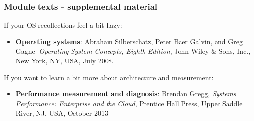 \begin{frame}
  \frametitle{Module texts - supplemental material}

  If your OS recollections feel a bit hazy:

  \begin{itemize}
    \item {\bf Operating systems}: Abraham Silberschatz, Peter Baer Galvin,
      and Greg Gagne, \textit{Operating System Concepts, Eighth Edition}, John
      Wiley \& Sons, Inc., New York, NY, USA, July 2008.
  \end{itemize}

  \pause
  \bigskip
  If you want to learn a bit more about architecture and measurement:

  \begin{itemize}
    \item {\bf Performance measurement and diagnosis}: Brendan Gregg,
      \textit{Systems Performance: Enterprise and the Cloud}, Prentice Hall
      Press, Upper Saddle River, NJ, USA, October 2013.
  \end{itemize}
\end{frame}

%
%

%

